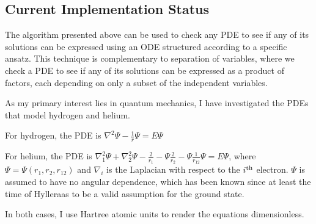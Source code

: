 \documentclass{article}
\begin{document}
\subsection*{Current Implementation Status}

The algorithm presented above can be used to check any PDE to see if any of its solutions
can be expressed using an ODE structured according to a specific ansatz.  This technique
is complementary to separation of variables, where we check a PDE to see if any of
its solutions can be expressed as a product of factors, each depending on only
a subset of the independent variables.

As my primary interest lies in quantum mechanics, I have investigated the PDEs
that model hydrogen and helium.

For hydrogen, the PDE is $\nabla^2 \Psi - \frac{1}{r} \Psi = E \Psi$

For helium, the PDE is $\nabla_1^2 \Psi + \nabla_2^2 \Psi - \frac{2}{r_1} - \Psi \frac{2}{r_2} - \Psi \frac{1}{r_{12}} \Psi = E \Psi$,
where $\Psi=\Psi(r_1,r_2,r_{12})$ and $\nabla_i$ is the Laplacian with respect to the $i^{\rm th}$ electron.
$\Psi$ is assumed to have no angular dependence, which has been known since
at least the time of Hylleraas to be a valid assumption for the ground state.

In both cases, I use Hartree atomic units to render the equations dimensionless.
\end{document}
